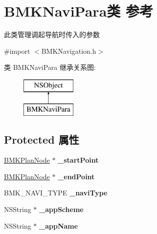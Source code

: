\hypertarget{interface_b_m_k_navi_para}{\section{B\+M\+K\+Navi\+Para类 参考}
\label{interface_b_m_k_navi_para}
}


此类管理调起导航时传入的参数  




{\ttfamily \#import $<$B\+M\+K\+Navigation.\+h$>$}

类 B\+M\+K\+Navi\+Para 继承关系图\+:\begin{figure}[H]
\begin{center}
\leavevmode
\includegraphics[height=2.000000cm]{interface_b_m_k_navi_para}
\end{center}
\end{figure}
\subsection*{Protected 属性}
\begin{DoxyCompactItemize}
\item 
\hypertarget{interface_b_m_k_navi_para_a61606b6d503536494dc88ca0f5c4a10a}{\hyperlink{interface_b_m_k_plan_node}{B\+M\+K\+Plan\+Node} $\ast$ {\bfseries \+\_\+start\+Point}}\label{interface_b_m_k_navi_para_a61606b6d503536494dc88ca0f5c4a10a}

\item 
\hypertarget{interface_b_m_k_navi_para_a4683a7844800c847ac279b643561f6ba}{\hyperlink{interface_b_m_k_plan_node}{B\+M\+K\+Plan\+Node} $\ast$ {\bfseries \+\_\+end\+Point}}\label{interface_b_m_k_navi_para_a4683a7844800c847ac279b643561f6ba}

\item 
\hypertarget{interface_b_m_k_navi_para_ab0dfd815bdc737dd794913d2389a4f0b}{B\+M\+K\+\_\+\+N\+A\+V\+I\+\_\+\+T\+Y\+P\+E {\bfseries \+\_\+navi\+Type}}\label{interface_b_m_k_navi_para_ab0dfd815bdc737dd794913d2389a4f0b}

\item 
\hypertarget{interface_b_m_k_navi_para_a506fe6a30001c88f3d0e1fcbc4e2754d}{N\+S\+String $\ast$ {\bfseries \+\_\+app\+Scheme}}\label{interface_b_m_k_navi_para_a506fe6a30001c88f3d0e1fcbc4e2754d}

\item 
\hypertarget{interface_b_m_k_navi_para_af5f38d4e1125aa660f65abd04b222438}{N\+S\+String $\ast$ {\bfseries \+\_\+app\+Name}}\label{interface_b_m_k_navi_para_af5f38d4e1125aa660f65abd04b222438}

\end{DoxyCompactItemize}

